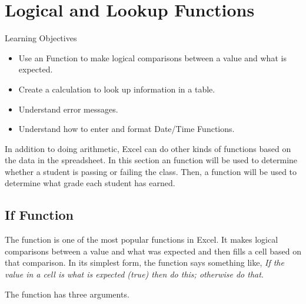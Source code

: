 \section{Logical and Lookup Functions}

\begin{center}
	\begin{objbox}{Learning Objectives}
		\begin{itemize}
			\setlength{\itemsep}{0pt}
			\setlength{\parskip}{0pt}
			\setlength{\parsep}{0pt}

			\item Use an  Function to make logical comparisons between a value and what is expected.
			\item Create a  calculation to look up information in a table.
			\item Understand error messages.
			\item Understand how to enter and format Date/Time Functions.
			
		\end{itemize}
	\end{objbox}
\end{center}

In addition to doing arithmetic, Excel can do other kinds of functions based on the data in the spreadsheet. In this section an  function will be used to determine whether a student is passing or failing the class. Then, a  function will be used to determine what grade each student has earned.

\subsection{If Function}

The  function is one of the most popular functions in Excel. It makes logical comparisons between a value and what was expected and then fills a cell based on that comparison. In its simplest form, the  function says something like, \textit{If the value in a cell is what is expected (true) then do this; otherwise do that}.

The  function has three arguments.

